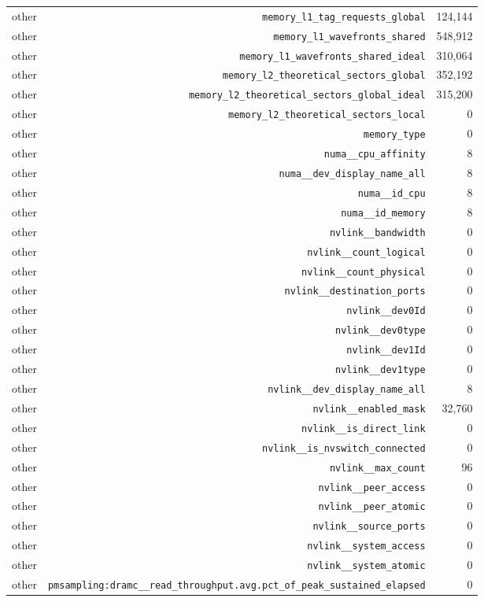 \begin{table}[h]
\begin{tabular}{|l|r|r|}
other & \texttt{memory_l1_tag_requests_global} & 124,144 \\
other & \texttt{memory_l1_wavefronts_shared} & 548,912 \\
other & \texttt{memory_l1_wavefronts_shared_ideal} & 310,064 \\
other & \texttt{memory_l2_theoretical_sectors_global} & 352,192 \\
other & \texttt{memory_l2_theoretical_sectors_global_ideal} & 315,200 \\
other & \texttt{memory_l2_theoretical_sectors_local} & 0 \\
other & \texttt{memory_type} & 0 \\
other & \texttt{numa__cpu_affinity} & 8 \\
other & \texttt{numa__dev_display_name_all} & 8 \\
other & \texttt{numa__id_cpu} & 8 \\
other & \texttt{numa__id_memory} & 8 \\
other & \texttt{nvlink__bandwidth} & 0 \\
other & \texttt{nvlink__count_logical} & 0 \\
other & \texttt{nvlink__count_physical} & 0 \\
other & \texttt{nvlink__destination_ports} & 0 \\
other & \texttt{nvlink__dev0Id} & 0 \\
other & \texttt{nvlink__dev0type} & 0 \\
other & \texttt{nvlink__dev1Id} & 0 \\
other & \texttt{nvlink__dev1type} & 0 \\
other & \texttt{nvlink__dev_display_name_all} & 8 \\
other & \texttt{nvlink__enabled_mask} & 32,760 \\
other & \texttt{nvlink__is_direct_link} & 0 \\
other & \texttt{nvlink__is_nvswitch_connected} & 0 \\
other & \texttt{nvlink__max_count} & 96 \\
other & \texttt{nvlink__peer_access} & 0 \\
other & \texttt{nvlink__peer_atomic} & 0 \\
other & \texttt{nvlink__source_ports} & 0 \\
other & \texttt{nvlink__system_access} & 0 \\
other & \texttt{nvlink__system_atomic} & 0 \\
other & \texttt{pmsampling:dramc__read_throughput.avg.pct_of_peak_sustained_elapsed} & 0 \\

\end{tabular}
\end{table}
